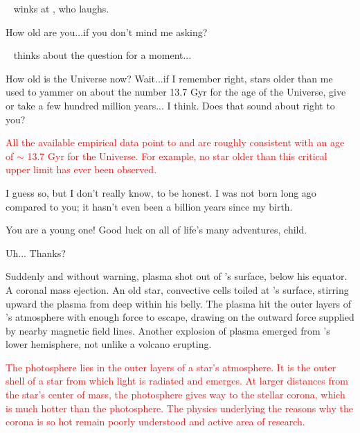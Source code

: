 \documentclass[main.tex]{subfiles}
\begin{document}
\par \nar \rmenrico~ winks at \rmsterope, who laughs.

\par \Sterope How old are you...if you don't mind me asking?

\par \nar \rmenrico~ thinks about the question for a moment...

\par \Enrico How old is the Universe now?  Wait...if I remember right, stars older than me used to yammer on about the number 13.7 Gyr for the age of the Universe, give or take a few hundred million years... I think.  Does that sound about right to you?

\begin{tcolorbox}[sharp corners, colback=red!30, colframe=red!80!blue, title=The Age of the Universe]
\par \textcolor{red} {All the available empirical data point to and are roughly consistent with an age of $\sim$ 13.7 Gyr  for the Universe.  For example, no star older than this critical upper limit has ever been observed.}
\end{tcolorbox} 


\par \Sterope I guess so, but I don't really know, to be honest.  I was not born long ago compared to you; it hasn't even been a billion years since my birth.

\par \Enrico You are a young one!  Good luck on all of life's many adventures, child.  

\par \Sterope Uh... Thanks?

\par \nar Suddenly and without warning, plasma shot out of \rmenrico's surface, below his equator.  A coronal mass ejection.  An old star, convective cells toiled at \rmenrico's surface, stirring upward the plasma from deep within his belly.  The plasma hit the outer layers of \rmenrico's atmosphere with enough force to escape, drawing on the outward force supplied by nearby magnetic field lines.  Another explosion of plasma emerged from \rmenrico's lower hemisphere, not unlike a volcano erupting.

\begin{tcolorbox}[sharp corners, colback=red!30, colframe=red!80!blue, title=Photosphere]
\par \textcolor{red} {The photosphere lies in the outer layers of a star's atmosphere.  It is the outer shell of a star from which light is radiated and emerges.  At larger distances from the star's center of mass, the photosphere gives way to the stellar corona, which is much hotter than the photosphere.  The physics underlying the reasons why the corona is so hot remain poorly understood and active area of research.}
\end{tcolorbox}
\end{document}
